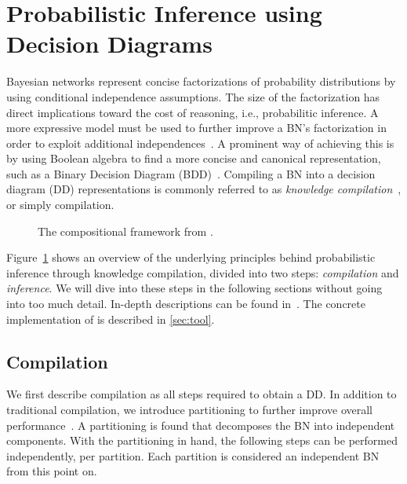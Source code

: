 
\section{Probabilistic Inference using Decision Diagrams}\label{sec:parallel}

Bayesian networks represent concise factorizations of probability distributions by using conditional independence assumptions. The size of the factorization has direct implications toward the cost of reasoning, i.e., probabilitic inference. A more expressive model must be used to further improve a BN's factorization in order to exploit additional independences~\cite{boutilier1996context,friedman1998learning,zhang1996exploiting}. A prominent way of achieving this is by using Boolean algebra to find a more concise and canonical representation, such as a Binary Decision Diagram (BDD)~\cite{bryant1986graph}. Compiling a BN into a decision diagram (DD) representations is commonly referred to as \emph{knowledge compilation}~\cite{darwiche2002knowledge}, or simply compilation.


\begin{figure}[!t]
    \centering

    \scalebox{0.9}{
    
    }
    \caption{The compositional framework from \cite{dal2021compositional}.}
    \label{fig:frameworkoverview}
\end{figure}


Figure~\ref{fig:frameworkoverview} shows an overview of the underlying principles behind probabilistic inference through knowledge compilation, divided into two steps: \emph{compilation} and \emph{inference}. We will dive into these steps in the following sections without going into too much detail. In-depth descriptions can be found in~\cite{dal2021compositional}. The concrete implementation of \toolname is described in \autoref{sec:tool}.

\subsection{Compilation}

We first describe compilation as all steps required to obtain a DD. In addition to traditional compilation, we introduce partitioning to further improve overall performance~\cite{dal2017reducing}.
A partitioning is found that decomposes the BN into independent components. With the partitioning in hand, the following steps can be performed independently, per partition. Each partition is considered an independent BN from this point on.

